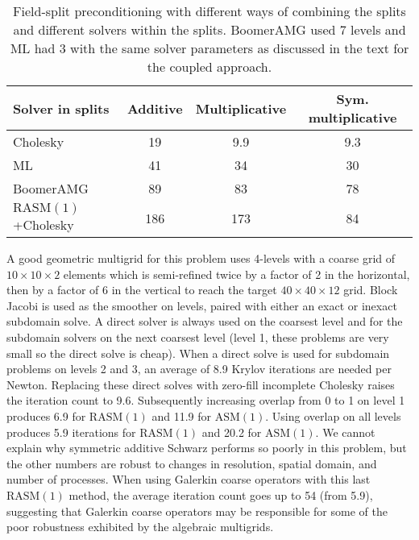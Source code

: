 \documentclass[3p]{elsarticle}
\newcommand{\ASM}{\mathrm{ASM}}
\newcommand{\RASM}{\mathrm{RASM}}
\begin{document}
\begin{table}
  \centering\caption{Field-split preconditioning with different ways of combining the splits and different solvers within the splits.  BoomerAMG used 7 levels and ML had 3 with the same solver parameters as discussed in the text for the coupled approach.}\label{tab:fieldsplit}
  \begin{tabular}{l|ccc}
    Solver in splits    & Additive & Multiplicative & Sym. multiplicative \\ \hline
    Cholesky            & 19       & 9.9            & 9.3                 \\
    ML                  & 41       & 34             & 30                  \\
    BoomerAMG           & 89       & 83             & 78                  \\
    $\RASM(1)$+Cholesky & 186      & 173            & 84
  \end{tabular}
\end{table}

A good geometric multigrid for this problem uses 4-levels with a coarse grid of $10\times 10\times 2$ elements which is semi-refined twice by a factor of 2 in the horizontal, then by a factor of 6 in the vertical to reach the target $40\times 40\times 12$ grid.  Block Jacobi is used as the smoother on levels, paired with either an exact or inexact subdomain solve.  A direct solver is always used on the coarsest level and for the subdomain solvers on the next coarsest level (level 1, these problems are very small so the direct solve is cheap).  When a direct solve is used for subdomain problems on levels 2 and 3, an average of 8.9 Krylov iterations are needed per Newton.  Replacing these direct solves with zero-fill incomplete Cholesky raises the iteration count to 9.6.  Subsequently increasing overlap from 0 to 1 on level 1 produces 6.9 for $\RASM(1)$ and 11.9 for $\ASM(1)$.  Using overlap on all levels produces 5.9 iterations for $\RASM(1)$ and 20.2 for $\ASM(1)$.  We cannot explain why symmetric additive Schwarz performs so poorly in this problem, but the other numbers are robust to changes in resolution, spatial domain, and number of processes.
When using Galerkin coarse operators with this last $\RASM(1)$ method, the average iteration count goes up to 54 (from 5.9), suggesting that Galerkin coarse operators may be responsible for some of the poor robustness exhibited by the algebraic multigrids.
\end{document}
